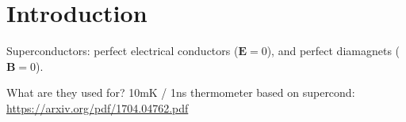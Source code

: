\chapter{Introduction}\noindent
Superconductors: perfect electrical conductors ($\bm{E} = 0$), and perfect diamagnets ($\bm{B} = 0$).

What are they used for?
10mK / 1ns thermometer based on supercond:
\url{https://arxiv.org/pdf/1704.04762.pdf}

\lipsum
